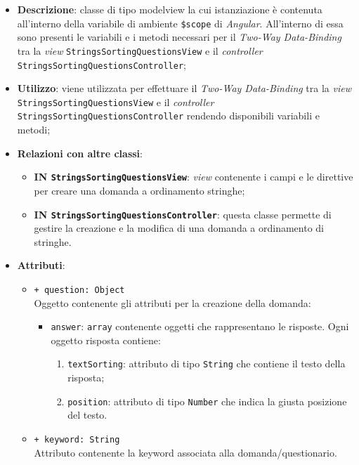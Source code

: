 \begin{itemize}
	\item \textbf{Descrizione}: classe di tipo modelview la cui istanziazione è contenuta all'interno della variabile di ambiente \texttt{\$scope} di \textit{Angular}. All'interno di essa sono presenti le variabili e i metodi necessari per il \textit{Two-Way Data-Binding} tra la \textit{view} \texttt{StringsSortingQuestionsView} e il \textit{controller} \texttt{StringsSortingQuestionsController}; 
	\item \textbf{Utilizzo}: viene utilizzata per effettuare il \textit{Two-Way Data-Binding} tra la \textit{view}\\ \texttt{StringsSortingQuestionsView} e il \textit{controller} \texttt{StringsSortingQuestionsController} rendendo disponibili variabili e metodi;
	\item \textbf{Relazioni con altre classi}:
	\begin{itemize}
		\item \textbf{IN \texttt{StringsSortingQuestionsView}}: \textit{view} contenente i campi e le direttive per creare una domanda a ordinamento stringhe; 
		\item \textbf{IN \texttt{StringsSortingQuestionsController}}: questa classe permette di gestire la creazione e la modifica di una domanda a ordinamento di stringhe.
	\end{itemize}
	\item \textbf{Attributi}:
	\begin{itemize}
			\item \texttt{+ question: Object} \\ Oggetto contenente gli attributi per la creazione della domanda:
			\begin{itemize}
				\item \texttt{answer}: \texttt{array} contenente oggetti che rappresentano le risposte. Ogni oggetto risposta contiene:
				\begin{enumerate}
					\item \texttt{textSorting}: attributo di tipo \texttt{String} che contiene il testo della risposta;
					\item \texttt{position}: attributo di tipo \texttt{Number} che indica la giusta posizione del testo.
				\end{enumerate}
			\end{itemize}
			\item \texttt{+ keyword: String} \\ Attributo contenente la keyword associata alla domanda/questionario.  

\end{itemize}
\end{itemize}
